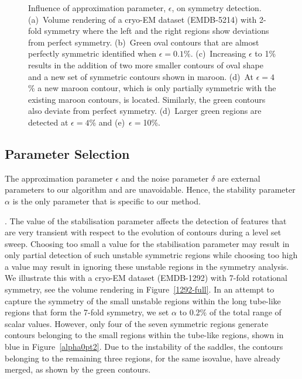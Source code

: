 \documentclass[review,journal]{vgtc}         %
\begin{document}
\begin{figure*}[t]
	\centering
	\caption{\label{eps}Influence of approximation parameter, $\epsilon$, on symmetry detection. (a)~Volume rendering of a cryo-EM dataset (EMDB-5214)
		with 2-fold symmetry where the left and the right regions show deviations from perfect symmetry.
		(b)~Green oval contours that are almost perfectly symmetric identified when $\epsilon=0.1$\%. (c)~Increasing
		$\epsilon$ to 1\% results in the addition of two more smaller contours of oval shape and a new set of symmetric
		contours shown in maroon. (d)~At $\epsilon=4$\% a new maroon contour, which is only partially symmetric with the 
		existing maroon contours, is located. Similarly, the green contours also deviate from perfect symmetry. 
		(d)~Larger green regions are detected at $\epsilon=4$\% and (e)~$\epsilon=$10\%.}
\end{figure*}

\subsection{Parameter Selection}\label{para}
The approximation parameter $\epsilon$ and the noise parameter $\delta$ are external parameters to our algorithm
and are unavoidable. Hence, the stability parameter $\alpha$ is the only parameter that is specific to our
method.

.
The value of the stabilisation parameter affects the detection of features that are very
transient with respect to the evolution of contours during a level set sweep. Choosing
too small a value for the stabilisation parameter may result in only partial detection
of such unstable symmetric regions while choosing too high a value may result in ignoring
these unstable regions in the symmetry analysis. We illustrate this with a cryo-EM dataset
(EMDB-1292) with 7-fold rotational symmetry, see the volume rendering
in Figure~\ref{1292-full}. In an attempt to capture the symmetry of the small unstable regions within
the long tube-like regions that form the 7-fold symmetry, we set $\alpha$ to 0.2\% of 
the total range of scalar values. However, only four of the seven symmetric
regions generate contours belonging to the small regions within the tube-like regions, shown
in blue in Figure~\ref{alpha0pt2}. Due to the instability of the saddles, the contours belonging to
the remaining three regions, for the same isovalue, have already merged, as shown by the green contours.
\end{document}
